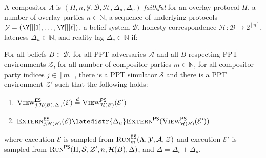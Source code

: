 \begin{definition}
  A compositor $\Lambda$
  is $(\Pi,\allowbreak n,\allowbreak \mathcal{Y},\allowbreak \mathcal{B},\allowbreak \mathcal{H},\allowbreak \Delta_u,\allowbreak \Delta_v)$-\emph{faithful}
  for an overlay protocol $\Pi$,
  a number of overlay parties $n \in \mathbb{N}$,
  a sequence of underlying protocols $\mathcal{Y} = (\Y[][1], \ldots, \Y[][\ell])$,
  a belief system $\mathcal{B}$,
  honesty correspondence $\mathcal{H}: \mathcal{B} \longrightarrow 2^{[n]}$,
  lateness $\Delta_u \in \mathbb{N}$,
  and reality lag $\Delta_v \in \mathbb{N}$
  if:

  For all beliefs $B \in \mathcal{B}$,
  for all PPT adversaries $\mathcal{A}$ and all
  $B$-respecting PPT environments $\mathcal{Z}$,
  for all number of compositor parties $m \in \mathbb{N}$,
  for all compositor party indices $j \in [m]$,
  there is a PPT simulator $\mathcal{S}$ and there is a
  PPT environment $\mathcal{Z}'$ such that
  the following holds:

  \begin{enumerate}
    \item $\LCView_{j,\mathcal{H}(B),\Delta_v}(\mathcal{E}) \distreq \PEView_{\mathcal{H}(B)}(\mathcal{E}')$
    \item $\LCExtern_{j,\mathcal{H}(B)}(\mathcal{E}) \latedistr{\Delta_u} \PEExtern(\PEView_{\mathcal{H}(B)}(\mathcal{E}'))$
  \end{enumerate}

  where execution $\mathcal{E}$ is sampled from
  $\textsc{Run}^{\textsf{ES}}_m(\Lambda, \mathcal{Y}, \mathcal{A}, \mathcal{Z})$
  and execution $\mathcal{E}'$ is sampled from
  $\textsc{Run}^{\textsf{PS}}(\Pi, \mathcal{S}, \mathcal{Z}', n, \mathcal{H}(B), \Delta)$,
  and $\Delta = \Delta_v + \Delta_u$.
\end{definition}


